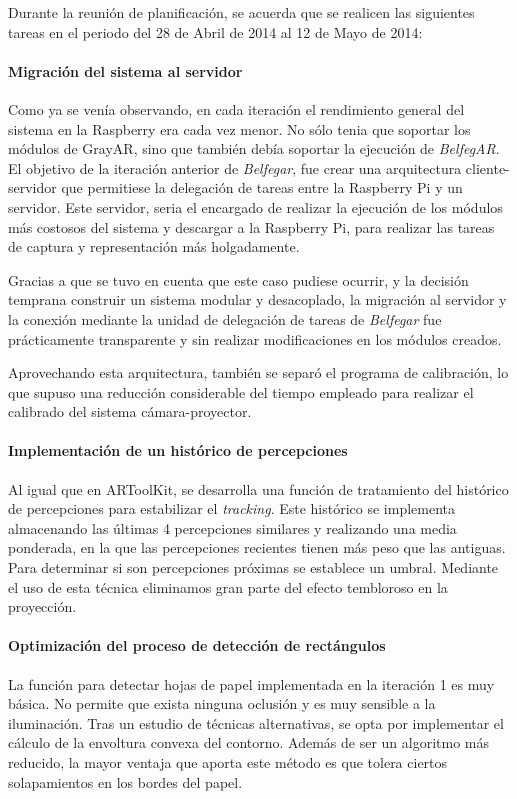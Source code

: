 Durante la reunión de planificación, se acuerda que se realicen las siguientes tareas en el periodo del 28 de Abril de 2014 al 12 de Mayo de 2014:

\paragraph{Migración del sistema al servidor}
Como ya se venía observando, en cada iteración el rendimiento general del sistema en la Raspberry era cada vez menor. No sólo tenia que soportar los módulos de GrayAR, sino que también debía soportar la ejecución de \textit{BelfegAR}. El objetivo de la iteración anterior de \textit{Belfegar}, fue crear una arquitectura cliente-servidor que permitiese la delegación de tareas entre la Raspberry Pi y un servidor. Este servidor, seria el encargado de realizar la ejecución de los módulos más costosos del sistema y descargar a la Raspberry Pi, para realizar las tareas de captura y representación más holgadamente.

Gracias a que se tuvo en cuenta que este caso pudiese ocurrir, y la decisión temprana construir un sistema  modular y desacoplado, la migración al servidor y la conexión mediante la unidad de delegación de tareas de \textit{Belfegar} fue prácticamente transparente y sin realizar modificaciones en los módulos creados.

Aprovechando esta arquitectura, también se separó el programa de calibración, lo que supuso una reducción considerable del tiempo empleado para realizar el calibrado del sistema cámara-proyector.
 
\paragraph{Implementación de un histórico de percepciones}
Al igual que en ARToolKit, se desarrolla una función de tratamiento del histórico de percepciones para estabilizar el \textit{tracking}. Este histórico se implementa almacenando las últimas 4 percepciones similares y realizando una media ponderada, en la que las percepciones recientes tienen más peso que las antiguas. Para determinar si son percepciones próximas se establece un umbral. Mediante el uso de esta técnica eliminamos gran parte del efecto tembloroso en la proyección.

\paragraph{Optimización del proceso de detección de rectángulos}
La función para detectar hojas de papel implementada en la iteración 1 es muy básica. No permite que exista ninguna oclusión y es muy sensible a la iluminación. Tras un estudio de técnicas alternativas, se opta por implementar el cálculo de la envoltura convexa del contorno. Además de ser un algoritmo más reducido, la mayor ventaja que aporta este método es que tolera ciertos solapamientos en los bordes del papel. 

